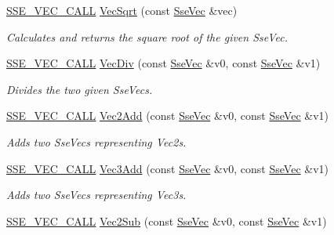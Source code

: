 \begin{DoxyCompactItemize}
\hyperlink{ssevec__math__defs_8h_a97454f977a5281455cecacce1e8ba670}{S\+S\+E\+\_\+\+V\+E\+C\+\_\+\+C\+A\+L\+L} \hyperlink{group___s_i_m_d_vec_math_ga7e1945dc7600a364035073bfc31eba23}{Vec\+Sqrt} (const \hyperlink{namespacegfxmath_a0de2243e2b8d0fd46d3af5e036423004}{Sse\+Vec} \&vec)
\begin{DoxyCompactList}\small\item\em Calculates and returns the square root of the given Sse\+Vec. \end{DoxyCompactList}\item 
\hyperlink{ssevec__math__defs_8h_a97454f977a5281455cecacce1e8ba670}{S\+S\+E\+\_\+\+V\+E\+C\+\_\+\+C\+A\+L\+L} \hyperlink{group___s_i_m_d_vec_math_ga0f942adcbe273e2e7039cb2b72db39a1}{Vec\+Div} (const \hyperlink{namespacegfxmath_a0de2243e2b8d0fd46d3af5e036423004}{Sse\+Vec} \&v0, const \hyperlink{namespacegfxmath_a0de2243e2b8d0fd46d3af5e036423004}{Sse\+Vec} \&v1)
\begin{DoxyCompactList}\small\item\em Divides the two given Sse\+Vecs. \end{DoxyCompactList}\item 
\hyperlink{ssevec__math__defs_8h_a97454f977a5281455cecacce1e8ba670}{S\+S\+E\+\_\+\+V\+E\+C\+\_\+\+C\+A\+L\+L} \hyperlink{group___s_i_m_d_vec_math_ga29878372e95cf910318ded73fc8ddf32}{Vec2\+Add} (const \hyperlink{namespacegfxmath_a0de2243e2b8d0fd46d3af5e036423004}{Sse\+Vec} \&v0, const \hyperlink{namespacegfxmath_a0de2243e2b8d0fd46d3af5e036423004}{Sse\+Vec} \&v1)
\begin{DoxyCompactList}\small\item\em Adds two Sse\+Vecs representing Vec2s. \end{DoxyCompactList}\item 
\hyperlink{ssevec__math__defs_8h_a97454f977a5281455cecacce1e8ba670}{S\+S\+E\+\_\+\+V\+E\+C\+\_\+\+C\+A\+L\+L} \hyperlink{group___s_i_m_d_vec_math_ga5517ceabe08dbd131b66cfe2f9a69209}{Vec3\+Add} (const \hyperlink{namespacegfxmath_a0de2243e2b8d0fd46d3af5e036423004}{Sse\+Vec} \&v0, const \hyperlink{namespacegfxmath_a0de2243e2b8d0fd46d3af5e036423004}{Sse\+Vec} \&v1)
\begin{DoxyCompactList}\small\item\em Adds two Sse\+Vecs representing Vec3s. \end{DoxyCompactList}\item 
\hyperlink{ssevec__math__defs_8h_a97454f977a5281455cecacce1e8ba670}{S\+S\+E\+\_\+\+V\+E\+C\+\_\+\+C\+A\+L\+L} \hyperlink{group___s_i_m_d_vec_math_ga8478f24ca65fd962fc3d40e2cf717674}{Vec2\+Sub} (const \hyperlink{namespacegfxmath_a0de2243e2b8d0fd46d3af5e036423004}{Sse\+Vec} \&v0, const \hyperlink{namespacegfxmath_a0de2243e2b8d0fd46d3af5e036423004}{Sse\+Vec} \&v1)

\end{DoxyCompactItemize}
